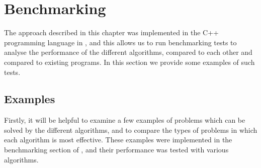


\section{Benchmarking}
\label{sec:benchmarking}

The approach described in this chapter was implemented in the C++ programming
language in \libsemigroups{} \cite{libsemigroups}, and this allows us to
run benchmarking tests to analyse the performance of the different algorithms,
compared to each other and compared to existing programs.  In this section we
provide some examples of such tests.

\subsection{Examples}
Firstly, it will be helpful to examine a few examples of problems which can be
solved by the different algorithms, and to compare the types of problems in
which each algorithm is most effective.  These examples were implemented in the
benchmarking section of \libsemigroups{}, and their performance was tested
with various algorithms.

